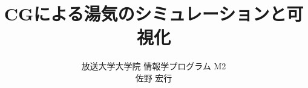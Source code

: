 \usepackage[dvipdfmx]{graphicx}
\usepackage[margin=30mm]{geometry}
\usepackage{url}
\usepackage{amsmath}


\title{CGによる湯気のシミュレーションと可視化}
\author{放送大学大学院 情報学プログラム M2\\ 佐野 宏行}
\maketitle